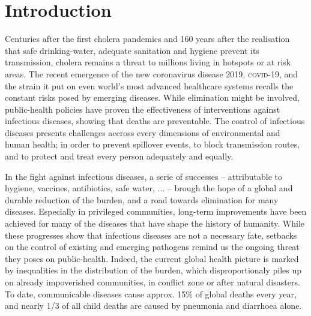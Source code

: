 \chapter*{Introduction} %
 Centuries after the first cholera pandemics and 160 years after the realisation that safe drinking-water, adequate sanitation and hygiene prevent its transmission, cholera remains a threat to millions living in hotspots or at risk areas. The recent emergence of the new coronavirus disease 2019, \textsc{covid}-19, and the strain it put on even world's most advanced healthcare systems recalls the constant risks posed by emerging diseases. 
While elimination might be involved, public-health policies have proven the effectiveness of interventions against infectious diseases, showing that deaths are preventable. The control of infectious diseases presents challenges accross every dimensions of environmental and human health; in order to prevent spillover events, to block transmission routes, and to protect and treat every person adequately and equally. 

In the fight against infectious diseases, a serie of successes -- attributable to \eg hygiene, vaccines, antibiotics, safe water, ... -- brough the hope of a global and durable reduction of the burden, and a road towards elimination for many diseases. Especially in privileged communities, long-term improvements have been achieved for many of the diseases that have shape the history of humanity. While these progresses show that infectious diseases are not a necessary fate, setbacks on the control of existing and emerging pathogens remind us the ongoing threat they poses on public-health. Indeed, the current global health picture is marked by inequalities in the distribution of the burden, which disproportionaly piles up on already impoverished communities, in conflict zone or after natural disasters. To date, communicable diseases cause approx. 15\% of global deaths every year\cite[-4\baselineskip][tab. 1, excl. non-transmissible neonatal and maternal diseases and nutritional diseases; pre-\textsc{covid}-19 estimates]{Roth:GlobalRegionalNational:2018}, and nearly 1/3 of all child deaths are caused by pneumonia and diarrhoea alone\cite[][\textsc{M} deaths among under 5, every year.]{WHO:EndingPreventableChild:2013}.
 
